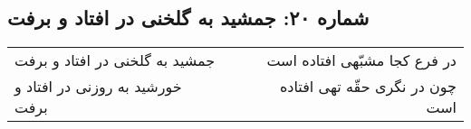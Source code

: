 \begin{center}
\section*{شماره ۲۰: جمشید به گلخنی در افتاد و برفت}
\label{sec:020}
\begin{longtable}{l p{0.5cm} r}
جمشید به گلخنی در افتاد و برفت
&&
در فرع کجا مشبّهی افتاده است
\\
خورشید به روزنی در افتاد و برفت
&&
چون در نگری حقّه تهی افتاده است
\\
\end{longtable}
\end{center}
